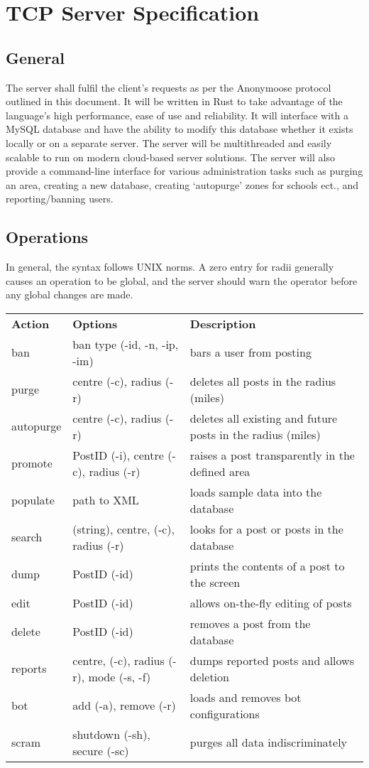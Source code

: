 \documentclass[12pt, a4paper]{article}
\begin{document}
\section{TCP Server Specification}
\subsection{General}
The server shall fulfil the client's requests as per the Anonymoose protocol outlined in this document. It will be written in Rust to take advantage of the language's high performance, ease of use and reliability. It will interface with a MySQL database and have the ability to modify this database whether it exists locally or on a separate server. The server will be multithreaded and easily scalable to run on modern cloud-based server solutions. The server will also provide a command-line interface for various administration tasks such as purging an area, creating a new database, creating `autopurge' zones for schools ect., and reporting/banning users.

\subsection{Operations}
In general, the syntax follows UNIX norms. A zero entry for radii generally causes an operation to be global, and the server should warn the operator before any global changes are made.
\begin{table}[h]
\centering
\begin{tabular}{lll}
\textbf{Action} & \textbf{Options} &\textbf{Description}\\
ban & ban type (-id, -n, -ip, -im) & bars a user from posting\\
purge & centre (-c), radius (-r) & deletes all posts in the radius (miles)\\
autopurge & centre (-c), radius (-r) & deletes all existing and future posts in the radius (miles)\\
promote & PostID (-i), centre (-c), radius (-r) & raises a post transparently in the defined area\\
populate & path to XML & loads sample data into the database\\
search & (string), centre, (-c), radius (-r) & looks for a post or posts in the database\\
dump & PostID (-id) & prints the contents of a post to the screen\\
edit & PostID (-id) & allows on-the-fly editing of posts\\
delete & PostID (-id) & removes a post from the database\\
reports & centre, (-c), radius (-r), mode (-s, -f) & dumps reported posts and allows deletion\\
bot & add (-a), remove (-r) & loads and removes bot configurations\\
scram & shutdown (-sh), secure (-sc) & purges all data indiscriminately\\
\end{tabular}
\end{table}
\end{document}
